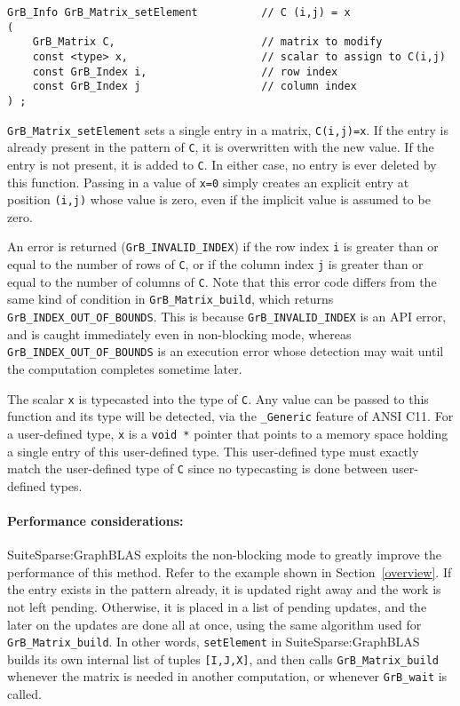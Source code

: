\documentclass[12pt]{article}
\begin{document}
\begin{mdframed}[userdefinedwidth=6in]
{\footnotesize
\begin{verbatim}
GrB_Info GrB_Matrix_setElement          // C (i,j) = x
(
    GrB_Matrix C,                       // matrix to modify
    const <type> x,                     // scalar to assign to C(i,j)
    const GrB_Index i,                  // row index
    const GrB_Index j                   // column index
) ;
\end{verbatim} } \end{mdframed}

\verb'GrB_Matrix_setElement' sets a single entry in a matrix, \verb'C(i,j)=x'.
If the entry is already present in the pattern of \verb'C', it is overwritten
with the new value.  If the entry is not present, it is added to \verb'C'.  In
either case, no entry is ever deleted by this function.  Passing in a value of
\verb'x=0' simply creates an explicit entry at position \verb'(i,j)' whose
value is zero, even if the implicit value is assumed to be zero.

An error is returned (\verb'GrB_INVALID_INDEX') if the row index \verb'i' is
greater than or equal to the number of rows of \verb'C', or if the column index
\verb'j' is greater than or equal to the number of columns of \verb'C'.  Note
that this error code differs from the same kind of condition in
\verb'GrB_Matrix_build', which returns \verb'GrB_INDEX_OUT_OF_BOUNDS'.  This is
because \verb'GrB_INVALID_INDEX' is an API error, and is caught immediately
even in non-blocking mode, whereas \verb'GrB_INDEX_OUT_OF_BOUNDS' is an
execution error whose detection may wait until the computation completes
sometime later. 

The scalar \verb'x' is typecasted into the type of \verb'C'.  Any value can be
passed to this function and its type will be detected, via the \verb'_Generic'
feature of ANSI C11.  For a user-defined type, \verb'x' is a \verb'void *'
pointer that points to a memory space holding a single entry of this
user-defined type.  This user-defined type must exactly match the user-defined
type of \verb'C' since no typecasting is done between user-defined types.

\paragraph{\bf Performance considerations:}
SuiteSparse:GraphBLAS exploits the non-blocking mode to greatly improve the
performance of this method.  Refer to the example shown in
Section~\ref{overview}.  If the entry exists in the pattern already, it is
updated right away and the work is not left pending.  Otherwise, it is placed
in a list of pending updates, and the later on the updates are done all at
once, using the same algorithm used for \verb'GrB_Matrix_build'.  In other
words, \verb'setElement' in SuiteSparse:GraphBLAS builds its own internal list
of tuples \verb'[I,J,X]', and then calls \verb'GrB_Matrix_build' whenever the
matrix is needed in another computation, or whenever \verb'GrB_wait' is called.
\end{document}
